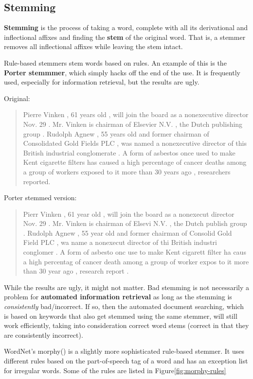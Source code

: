 \documentclass{article}
\begin{document}
\subsection{Stemming}

\textbf{Stemming} is the process of taking a word, complete with all its derivational and inflectional affixes and finding the \textbf{stem} of the original word. That is, a stemmer removes all inflectional affixes while leaving the stem intact.

Rule-based stemmers stem words based on rules. An example of this is the \textbf{Porter stemmmer}, which simply hacks off the end of the use. It is frequently used, especially for information retrieval, but the results are ugly.

Original:
\begin{quote}
Pierre Vinken , 61 years old , will join the board as a nonexecutive
director Nov. 29 . Mr. Vinken is chairman of Elsevier N.V. , the Dutch
publishing group . Rudolph Agnew , 55 years old and former chairman of
Consolidated Gold Fields PLC , was named a nonexecutive director of
this British industrial conglomerate . A form of asbestos once used to
make Kent cigarette filters has caused a high percentage of cancer
deaths among a group of workers exposed to it more than 30 years ago ,
researchers reported.
\end{quote}

Porter stemmed version:
\begin{quote}
Pierr Vinken , 61 year old , will join the board as a nonexecut
director Nov. 29 . Mr. Vinken is chairman of Elsevi N.V. , the Dutch
publish group . Rudolph Agnew , 55 year old and former chairman of
Consolid Gold Field PLC , wa name a nonexecut director of thi British
industri conglomer . A form of asbesto onc use to make Kent cigarett
filter ha caus a high percentag of cancer death among a group of
worker expos to it more than 30 year ago , research report .
\end{quote}

While the results are ugly, it might not matter. Bad stemming is not necessarily a problem for \textbf{automated information retrieval} as long as the stemming is \textit{consistently} bad/incorrect. If so, then the automated document searching, which is based on keywords that also get stemmed using the same stemmer, will still work efficiently, taking into consideration correct word stems (correct in that they are consistently incorrect).

WordNet's morphy() is a slightly more sophisticated rule-based stemmer. It uses different rules based on the part-of-speech tag of a word and has an exception list for irregular words. Some of the rules are listed in Figure\ref{fig:morphy-rules}
\end{document}
